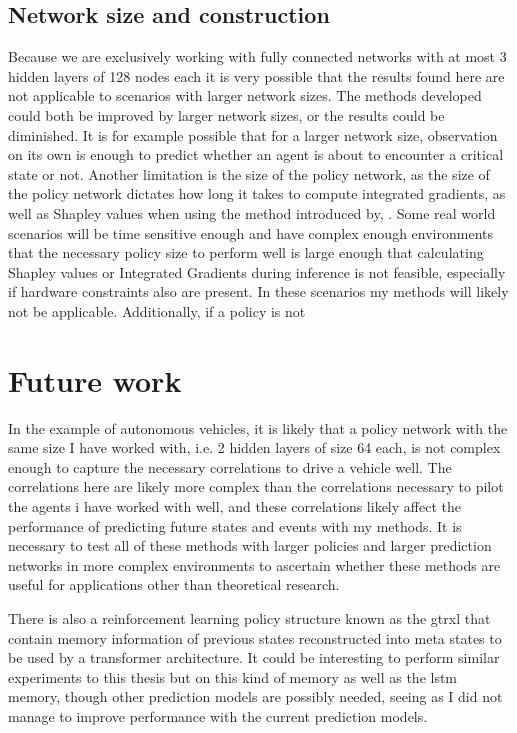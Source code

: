 \documentclass[UKenglish]{uiomasterthesis}
\begin{document}
\subsection{Network size and construction}
Because we are exclusively working with fully connected networks with at most 3 hidden layers of 128 nodes each it is very possible that the results found here are not applicable to scenarios with larger network sizes. The methods developed could both be improved by larger network sizes, or the results could be diminished. It is for example possible that for a larger network size, observation on its own is enough to predict whether an agent is about to encounter a critical state or not. 
Another limitation is the size of the policy network, as the size of the policy network dictates how long it takes to compute integrated gradients, as well as Shapley values when using the method introduced by,  . Some real world scenarios will be time sensitive enough and have complex enough environments that the necessary policy size to perform well is large enough that calculating Shapley values or Integrated Gradients during inference is not feasible, especially if hardware constraints also are present. In these scenarios my methods will likely not be applicable.
Additionally, if a policy is not

\section{Future work}
In the example of autonomous vehicles, it is likely that a policy network with the same size I have worked with, i.e. 2 hidden layers of size 64 each, is not complex enough to capture the necessary correlations to drive a vehicle well. The correlations here are likely more complex than the correlations necessary to pilot the agents i have worked with well, and these correlations likely affect the performance of predicting future states and events with my methods. It is necessary to test all of these methods with larger policies and larger prediction networks in more complex environments to ascertain whether these methods are useful for applications other than theoretical research. 

There is also a reinforcement learning policy structure known as the \ac{gtrxl} that contain memory information of previous states reconstructed into meta states to be used by a transformer architecture. It could be interesting to perform similar experiments to this thesis but on this kind of memory as well as the lstm memory, though other prediction models are possibly needed, seeing as I did not manage to improve performance with the current prediction models.
\end{document}
